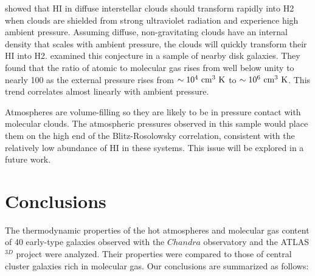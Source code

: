 \documentclass[iop]{emulateapj}
\begin{document}
\citet{Elmegreen:93} showed that HI in diffuse interstellar clouds should transform rapidly into H2 when clouds are shielded from strong ultraviolet radiation and experience high ambient pressure.  Assuming diffuse, non-gravitating clouds have an internal density that scales with ambient pressure, the clouds will quickly transform their HI into H2. \citet{Blitz:04, Blitz:06} examined this conjecture in a sample of nearby disk galaxies.
They found that the ratio of atomic to molecular gas rises from well below unity to nearly 100 as the external pressure rises from $\sim 10^4~ \rm cm^3~K$ to $\sim 10^6~ \rm cm^3~K$. This trend correlates almost linearly with ambient pressure. 

Atmospheres are volume-filling so they are likely to be in pressure contact with molecular clouds.  The atmospheric pressures observed in this sample would place them on the high end of the Blitz-Rosolowsky correlation, consistent with the relatively low abundance of HI in these systems. This issue will be explored in a future work.



\section{Conclusions}\label{sec_conc}

The thermodynamic properties of the hot atmospheres and molecular gas content of 40 early-type galaxies observed with the $Chandra$ observatory and the ATLAS${}^{3D}$ project were analyzed.  Their properties were compared to those of central cluster galaxies rich in molecular gas. Our conclusions are summarized as follows: 
\end{document}
